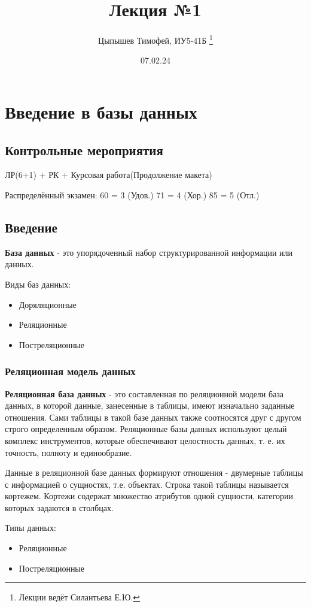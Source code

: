 \documentclass[12pt, a4paper]{report}
\title{Лекция №1}
\author{Цыпышев Тимофей, ИУ5-41Б \thanks{Лекции ведёт Силантьева Е.Ю.}}
\date{07.02.24}
\begin{document}

\chapter{Введение в базы данных}

\section{Контрольные мероприятия}

ЛР(6+1) + РК + Курсовая работа(Продолжение макета)

Распределённый экзамен:
60 = 3 (Удов.)
71 = 4 (Хор.)
85 = 5 (Отл.)

\section{Введение}

\textbf{База данных}  - это упорядоченный набор структурированной информации или данных.

Виды баз данных:
\begin{itemize}
    \item Доряляционные
    \item Реляционные
    \item Постреляционные
\end{itemize}

\subsection{Реляционная модель данных}

\textbf{Реляционная база данных} - это составленная по реляционной модели база данных, в которой данные, занесенные в таблицы, имеют изначально заданные отношения. Сами таблицы в такой базе данных также соотносятся друг с другом строго определенным образом. Реляционные базы данных используют целый комплекс инструментов, которые обеспечивают целостность данных, т. е. их точность, полноту и единообразие.

Данные в реляционной базе данных формируют отношения - двумерные таблицы с информацией о сущностях, т.е. объектах. Строка такой таблицы называется кортежем. Кортежи содержат множество атрибутов одной сущности, категории которых задаются в столбцах.

Типы данных:
\begin{itemize}
    \item Реляционные
    \item Постреляционные
\end{itemize}
\end{document}
